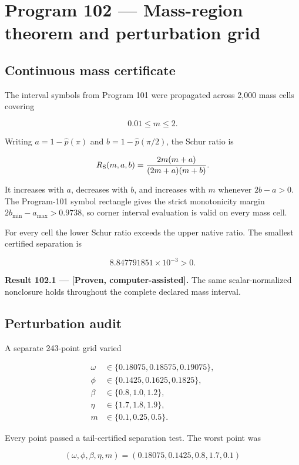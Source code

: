 \documentclass[11pt,a4paper,openany]{report}
\newcommand{\statusComputer}{\textcolor{fingreen}{[Proven, computer-assisted]}}
\begin{document}
\section{Program 102 --- Mass-region theorem and perturbation grid}

\subsection{Continuous mass certificate}

The interval symbols from Program 101 were propagated across 2,000 mass cells covering

\[
0.01\le m\le2.
\]

Writing \(a=1-\widehat p(\pi)\) and \(b=1-\widehat p(\pi/2)\), the Schur ratio is

\[
R_{\rm S}(m,a,b)
=
\frac{2m(m+a)}{(2m+a)(m+b)}.
\]

It increases with \(a\), decreases with \(b\), and increases with \(m\) whenever \(2b-a>0\). The Program-101 symbol rectangle gives the strict monotonicity margin \(2b_{\min}-a_{\max}>0.9738\), so corner interval evaluation is valid on every mass cell.

For every cell the lower Schur ratio exceeds the upper native ratio. The smallest certified separation is

\[
8.847791851\times10^{-3}>0.
\]

\textbf{Result 102.1 --- \statusComputer{}.} The same scalar-normalized nonclosure holds throughout the complete declared mass interval.

\subsection{Perturbation audit}

A separate 243-point grid varied

\[
\begin{aligned}
\omega&\in\{0.18075,0.18575,0.19075\},\\
\phi&\in\{0.1425,0.1625,0.1825\},\\
\beta&\in\{0.8,1.0,1.2\},\\
\eta&\in\{1.7,1.8,1.9\},\\
m&\in\{0.1,0.25,0.5\}.
\end{aligned}
\]

Every point passed a tail-certified separation test. The worst point was

\[
(\omega,\phi,\beta,\eta,m)
=(0.18075,0.1425,0.8,1.7,0.1)
\]
\end{document}
